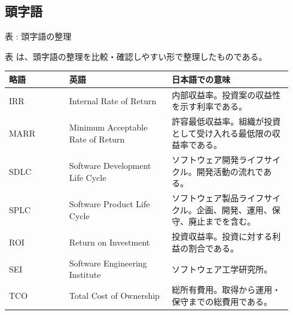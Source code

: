 \subsection*{頭字語}
\par\smallskip\noindent{}\label{tab:ch15-02}表 \thetable: 頭字語の整理\par\smallskip
表 \thetable は、頭字語の整理を比較・確認しやすい形で整理したものである。\par\smallskip
\begin{longtable}{L{0.20\linewidth} L{0.34\linewidth} L{0.40\linewidth}}
\toprule
略語 & 英語 & 日本語での意味 \\
\midrule
IRR & Internal Rate of Return & 内部収益率。投資案の収益性を示す利率である。 \\
MARR & Minimum Acceptable Rate of Return & 許容最低収益率。組織が投資として受け入れる最低限の収益率である。 \\
SDLC & Software Development Life Cycle & ソフトウェア開発ライフサイクル。開発活動の流れである。 \\
SPLC & Software Product Life Cycle & ソフトウェア製品ライフサイクル。企画、開発、運用、保守、廃止までを含む。 \\
ROI & Return on Investment & 投資収益率。投資に対する利益の割合である。 \\
SEI & Software Engineering Institute & ソフトウェア工学研究所。 \\
TCO & Total Cost of Ownership & 総所有費用。取得から運用・保守までの総費用である。 \\
\bottomrule
\end{longtable}
